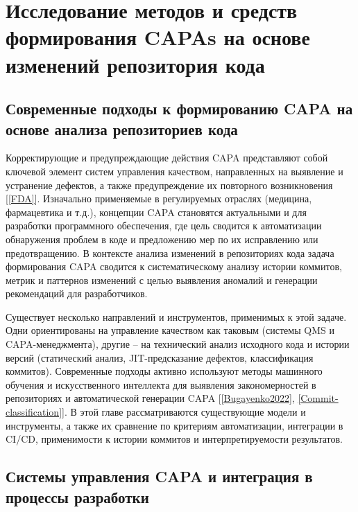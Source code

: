 \chapter{Исследование методов и средств  формирования CAPAs на основе изменений репозитория кода} \label{ch1}

\section{Современные подходы к формированию CAPA на основе анализа репозиториев кода} \label{ch1:sec1}

Корректирующие и предупреждающие действия CAPA представляют собой ключевой элемент систем управления качеством, направленных на выявление и устранение дефектов, а также предупреждение их повторного возникновения [\ref{FDA}]. Изначально применяемые в регулируемых отраслях (медицина, фармацевтика и т.д.), концепции CAPA становятся актуальными и для разработки программного обеспечения, где цель сводится к автоматизации обнаружения проблем в коде и предложению мер по их исправлению или предотвращению. В контексте анализа изменений в репозиториях кода задача формирования CAPA сводится к систематическому анализу истории коммитов, метрик и паттернов изменений с целью выявления аномалий и генерации рекомендаций для разработчиков.

Существует несколько направлений и инструментов, применимых к этой задаче. Одни ориентированы на управление качеством как таковым (системы QMS и CAPA-менеджмента), другие – на технический анализ исходного кода и истории версий (статический анализ, JIT-предсказание дефектов, классификация коммитов). Современные подходы активно используют методы машинного обучения и искусственного интеллекта для выявления закономерностей в репозиториях и автоматической генерации CAPA [\ref{Bugayenko2022}, \ref{Commit-classification}]. В этой главе рассматриваются существующие модели и инструменты, а также их сравнение по критериям автоматизации, интеграции в CI/CD, применимости к истории коммитов и интерпретируемости результатов.

\section{Системы управления CAPA и интеграция в процессы разработки} \label{ch1:sec2}

